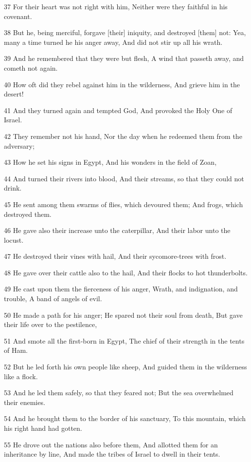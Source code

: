 \par 37 For their heart was not right with him, Neither were they faithful in his covenant.
\par 38 But he, being merciful, forgave [their] iniquity, and destroyed [them] not: Yea, many a time turned he his anger away, And did not stir up all his wrath.
\par 39 And he remembered that they were but flesh, A wind that passeth away, and cometh not again.
\par 40 How oft did they rebel against him in the wilderness, And grieve him in the desert!
\par 41 And they turned again and tempted God, And provoked the Holy One of Israel.
\par 42 They remember not his hand, Nor the day when he redeemed them from the adversary;
\par 43 How he set his signs in Egypt, And his wonders in the field of Zoan,
\par 44 And turned their rivers into blood, And their streams, so that they could not drink.
\par 45 He sent among them swarms of flies, which devoured them; And frogs, which destroyed them.
\par 46 He gave also their increase unto the caterpillar, And their labor unto the locust.
\par 47 He destroyed their vines with hail, And their sycomore-trees with frost.
\par 48 He gave over their cattle also to the hail, And their flocks to hot thunderbolts.
\par 49 He cast upon them the fierceness of his anger, Wrath, and indignation, and trouble, A band of angels of evil.
\par 50 He made a path for his anger; He spared not their soul from death, But gave their life over to the pestilence,
\par 51 And smote all the first-born in Egypt, The chief of their strength in the tents of Ham.
\par 52 But he led forth his own people like sheep, And guided them in the wilderness like a flock.
\par 53 And he led them safely, so that they feared not; But the sea overwhelmed their enemies.
\par 54 And he brought them to the border of his sanctuary, To this mountain, which his right hand had gotten.
\par 55 He drove out the nations also before them, And allotted them for an inheritance by line, And made the tribes of Israel to dwell in their tents.
